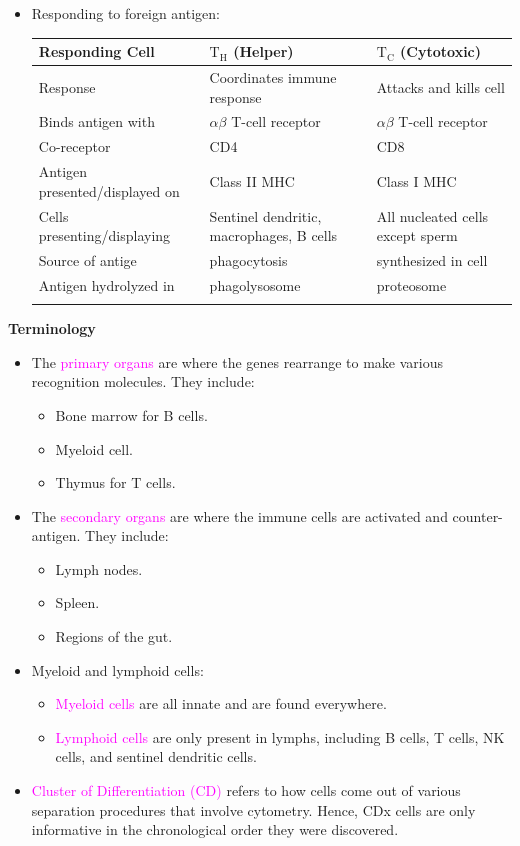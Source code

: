 \documentclass[UTF8]{book}
\newcommand{\et}{&}
\newcommand{\concept}[1]{\textcolor{magenta}{#1}}
\begin{document}
\begin{itemize}
\item Responding to foreign antigen:
\begin{center}
\begin{tabular}{|m{5.5cm}<{\centering}|m{4cm}<{\centering}|m{4cm}<{\centering}|} \Xhline{1.2pt}
Responding Cell \et $\mathrm{T_H}$ (Helper) \et $\mathrm{T_C}$ (Cytotoxic) \\ \hline
Response \et Coordinates immune response \et Attacks and kills cell\\ \hline
Binds antigen with \et $\alpha\beta$ T-cell receptor \et $\alpha\beta$ T-cell receptor\\ \hline
Co-receptor \et CD4 \et CD8\\ \hline
Antigen presented/displayed on \et Class II MHC \et Class I MHC\\ \hline
Cells presenting/displaying \et Sentinel dendritic, macrophages, B cells\et All nucleated cells except sperm\\ \hline
Source of antige \et phagocytosis \et synthesized in cell\\ \hline
Antigen hydrolyzed in \et phagolysosome \et proteosome\\ \Xhline{1.2pt}
\end{tabular}
\end{center}
\end{itemize}
\newpage
{}\quad \textbf{Terminology}
\begin{itemize}
\item The \concept{primary organs} are where the genes rearrange to make various recognition molecules. They include:
\begin{itemize}
	\item Bone marrow for B cells.
	\item Myeloid cell.
	\item Thymus for T cells. 
\end{itemize}
\item The \concept{secondary organs} are where the immune cells are activated and counter-antigen. They include:
\begin{itemize}
	\item Lymph nodes.
	\item Spleen.
	\item Regions of the gut.
\end{itemize}
\item Myeloid and lymphoid cells:
\begin{itemize}
	\item \concept{Myeloid cells} are all innate and are found everywhere.
	\item \concept{Lymphoid cells} are only present in lymphs, including B cells, T cells, NK cells, and sentinel dendritic cells.
\end{itemize}
\item \concept{Cluster of Differentiation (CD)} refers to how cells come out of various separation procedures that involve cytometry. Hence, CDx cells are only informative in the chronological order they were discovered.
\end{itemize}
\end{document}
